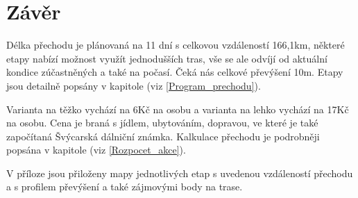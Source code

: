 \chapter*{Závěr}
\label{Souhrn}
\fancyhead{}
\def\figurename{Obr.} %
\def\tablename{Tab.} %
\def\figureautorefname{obr.} %
\def\tableautorefname{tab.} %
\def\chapterautorefname{kapitola} %

Délka přechodu je plánovaná na 11 dní s celkovou vzdáleností 166,1\:km, některé etapy nabízí možnost využít jednodušších tras, vše se ale odvíjí od aktuální kondice zúčastněných a také na počasí. Čeká nás celkové převýšení 10\:m. Etapy jsou detailně popsány v kapitole (viz \autoref{Program_prechodu}).

Varianta na těžko vychází na 6\:Kč na osobu a varianta na lehko vychází na 17\:Kč na osobu. Cena je braná s jídlem, ubytováním, dopravou, ve které je také započítaná Švýcarská dálniční známka. 
Kalkulace přechodu je podrobněji popsána v kapitole (viz \autoref{Rozpocet_akce}).

V příloze jsou přiloženy mapy jednotlivých etap s uvedenou vzdáleností přechodu a s profilem převýšení a také zájmovými body na trase.